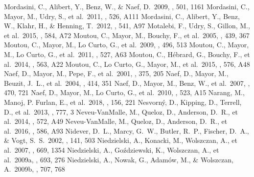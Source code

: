 \documentclass[twocolumn]{aastex62}
\begin{document}
\begin{CJK*}{UTF8}{min}
\begin{thebibliography}{}
 Mordasini, C., Alibert, Y., Benz, W., \& Naef, D.\ 2009, \aap, 501, 1161
 Mordasini, C., Mayor, M., Udry, S., et al.\ 2011, \aap, 526, A111
 Mordasini, C., Alibert, Y., Benz, W., Klahr, H., \& Henning, T.\ 2012, \aap, 541, A97
 Motalebi, F., Udry, S., Gillon, M., et al.\ 2015, \aap, 584, A72
 Moutou, C., Mayor, M., Bouchy, F., et al.\ 2005, \aap, 439, 367
 Moutou, C., Mayor, M., Lo Curto, G., et al.\ 2009, \aap, 496, 513
 Moutou, C., Mayor, M., Lo Curto, G., et al.\ 2011, \aap, 527, A63
 Moutou, C., H{\'e}brard, G., Bouchy, F., et al.\ 2014, \aap, 563, A22
 Moutou, C., Lo Curto, G., Mayor, M., et al.\ 2015, \aap, 576, A48
 Naef, D., Mayor, M., Pepe, F., et al.\ 2001, \aap, 375, 205
 Naef, D., Mayor, M., Beuzit, J.~L., et al.\ 2004, \aap, 414, 351
 Naef, D., Mayor, M., Benz, W., et al.\ 2007, \aap, 470, 721
 Naef, D., Mayor, M., Lo Curto, G., et al.\ 2010, \aap, 523, A15
 Narang, M., Manoj, P. Furlan, E., et al.\ 2018, \aj, 156, 221
 Nesvorn{\'y}, D., Kipping, D., Terrell, D., et al.\ 2013, \apj, 777, 3
 Neveu-VanMalle, M., Queloz, D., Anderson, D.~R., et al.\ 2014, \aap, 572, A49
 Neveu-VanMalle, M., Queloz, D., Anderson, D.~R., et al.\ 2016, \aap, 586, A93
 Nidever, D.~L., Marcy, G.~W., Butler, R.~P., Fischer, D.~A., \& Vogt, S.~S.\ 2002, \apjs, 141, 503
 Niedzielski, A., Konacki, M., Wolszczan, A., et al.\ 2007, \apj, 669, 1354
 Niedzielski, A., Go{\'z}dziewski, K., Wolszczan, A., et al.\ 2009a, \apj, 693, 276
 Niedzielski, A., Nowak, G., Adam{\'o}w, M., \& Wolszczan, A.\ 2009b, \apj, 707, 768

\end{thebibliography}
\end{CJK*}
\end{document}
